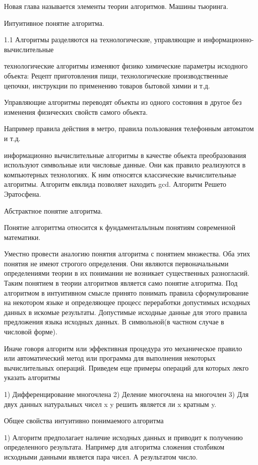 Новая глава называется элементы теории алгоритмов. Машины тьюринга.

Интуитивное понятие алгоритма.

1.1 Алгоритмы разделяются на технологические, управляющие и информационно-вычислительные

технологические алгоритмы изменяют физико химические параметры исходного объекта:
Рецепт приготовления пищи, технологические производственные цепочки, инструкции по применению товаров бытовой химии и т.д.

Управляющие алгоритмы переводят объекты из одного состояния в другое без изменения физических свойств самого объекта.

Например правила действия в метро, правила пользования телефонным автоматом и т.д.

информационно вычислительные алгоритмы в качестве объекта преобразования используют символьные или числовые данные. Они как правило реализуются в компьютерных технологиях. К ним относятся классические вычислительные алгоритмы. Алгоритм евклида позволяет находить gcd. Алгоритм Решето Эратосфена.

Абстрактное понятие алгоритма.

Понятие алгориттма относится к фундаментальлным понятиям современной математики.

Уместно провести аналогию понятия алгоритма с понятием множества. Оба этих понятия не имеют строгого определения. Они являются первоначальными определениями теории в их понимании не возникает существенных разногласий. Таким понятием в теории алгоритмов является само понятие алгоритма. Под алгоритмом в интуитивном смысле принято понимать правила сформулирование на некотором языке и определяющее процесс переработки допустимых исходных данных в искомые результаты. Допустимые исходные данные для этого правила предложения языка исходных данных. В символьной(в частном случае в числовой форме).

Иначе говоря алгоритм или эффективная процедура это механическое правило или автоматический метод или программа для выполнения некоторых вычислительных операций.
Приведем еще примеры операций для которых лекго указать алгоритмы

1) Дифференцирование многочлена
2) Деление многочлена на многочлен
3) Для двух данных натуральных чисел x y решить является ли x кратным y.

Общее свойства интуитивно понимаемого алгоритма

1) Алгоритм предполагает наличие исходных данных и приводит к получению определенного результата. Например для алгоритма сложения столбиком исходными данными является пара чисел. А результатом число.

